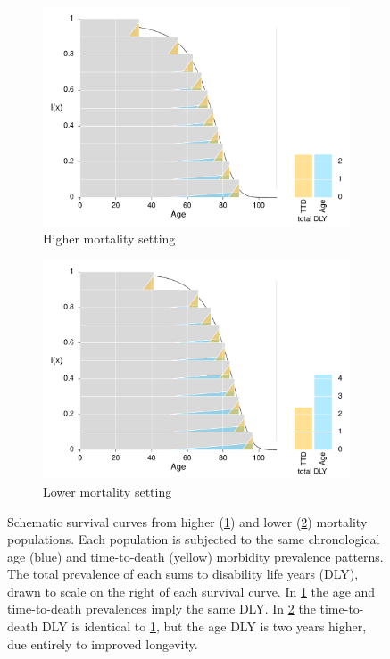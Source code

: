 \documentclass[11pt,oneside,a4paper]{article} %
\begin{document}
\begin{figure}
\centering
\begin{subfigure}{.5\textwidth}
  \centering
  \includegraphics[width=.98\linewidth]{Figures/Japan1970}
  \caption{Higher mortality setting}
  \label{fig:toypop1}
\end{subfigure}%
\begin{subfigure}{.5\textwidth}
  \centering
  \includegraphics[width=.98\linewidth]{Figures/Japan2010}
  \caption{Lower mortality setting}
  \label{fig:toypop2}
\end{subfigure}
\caption{Schematic survival curves from higher (\ref{fig:toypop1}) and lower
(\ref{fig:toypop2}) mortality populations. Each population is
subjected to the same chronological age (blue) and time-to-death (yellow)
morbidity prevalence patterns. The total prevalence of each sums to disability life years
(DLY), drawn to scale on the right of each survival curve. In \ref{fig:toypop1}
the age and time-to-death prevalences imply the same DLY. In
\ref{fig:toypop2} the time-to-death DLY is identical to \ref{fig:toypop1}, but
the age DLY is two years higher, due entirely to improved longevity.}
\label{fig:test}
\end{figure}
\end{document}
